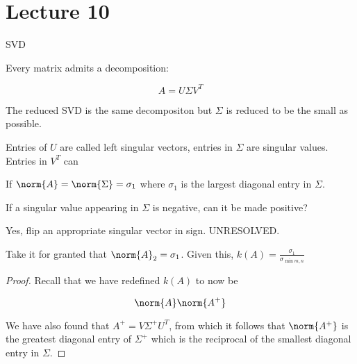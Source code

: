 \documentclass[../main.tex]{subfiles}
\begin{document}
\section{Lecture 10}{SVD}

\begin{definition}
    Every matrix admits a decomposition:

    \[
        A = U \Sigma V^T
    \]

    The reduced SVD is the same decompositon but $\Sigma$ is reduced
    to be the small as possible.

    Entries of $U$ are called left singular vectors, entries in $\Sigma$ are singular values. Entries in $V^T$ can
\end{definition}

\begin{theorem}
    If $\norm{A} = \norm{\Sigma} = \sigma_1$ where $\sigma_1$ is the largest diagonal entry in $\Sigma$.
\end{theorem}

\begin{remark}
    If a singular value appearing in $\Sigma$ is negative, can it be made positive?
\end{remark}
\begin{solution}
    Yes, flip an appropriate singular vector in sign. UNRESOLVED.
\end{solution}

\begin{proposition}
    Take it for granted that $\norm{A}_2 = \sigma_1$. Given this, $k(A) = \frac{\sigma_1}{\sigma_{\min{m,n}}}$
\end{proposition}

\begin{proof}
    Recall that we have redefined $k(A)$ to now be

    \[
        \norm{A} \norm{A^{+}}
    \]

    We have also found that $A^{+} = V \Sigma^{+} U^T$, from which it follows that $\norm{A^{+}}$ is the greatest diagonal entry of $\Sigma^{+}$ which is the reciprocal of the smallest diagonal entry in $\Sigma$.
\end{proof}
\end{document}
